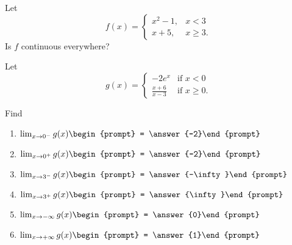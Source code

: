\documentclass{ximera}
\begin{document}
\begin{exercise}



Let
\[
f(x) =
\begin{cases}
  x^2-1, &x < 3 \\
  x+5,  &x\geq 3.
\end{cases}
\]
Is $f$ continuous everywhere? 

\begin{multipleChoice}
\end{multipleChoice}

\end{exercise}







\begin{exercise}


Let
\[
g(x)=\begin{cases}
-2e^{x} & \text{if $x<0$}\\
\frac{x+6}{x-3} & \text{if $x\ge0$}.
\end{cases}
\]

Find
\begin{enumerate}
\item		$\lim_{x\to 0^{-}} g(x)\begin{prompt} = \answer{-2}\end{prompt}$
\item		$\lim_{x\to 0^+} g(x)\begin{prompt} = \answer{-2}\end{prompt}$
\item		$\lim_{x\to 3^{-}} g(x)\begin{prompt} = \answer{-\infty}\end{prompt}$
\item		$\lim_{x\to 3^{+}} g(x)\begin{prompt} = \answer{\infty}\end{prompt}$
\item		$\lim_{x\to -\infty} g(x)\begin{prompt} = \answer{0}\end{prompt}$
\item		$\lim_{x\to +\infty} g(x)\begin{prompt} = \answer{1}\end{prompt}$
\end{enumerate}
\end{exercise}
\end{document}

